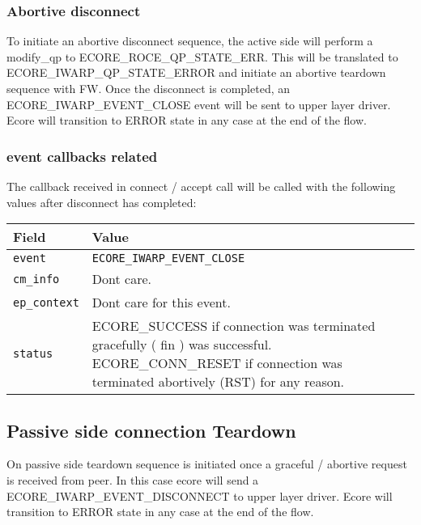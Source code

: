 \documentclass[11pt,fleqn,hidelinks,oneside]{book} %
\begin{document}
\subsubsection{Abortive disconnect}
To initiate an abortive disconnect sequence, the active side will perform a modify\_qp to ECORE\_ROCE\_QP\_STATE\_ERR. This will be translated to ECORE\_IWARP\_QP\_STATE\_ERROR and initiate an abortive teardown sequence with FW. Once the disconnect is completed, an ECORE\_IWARP\_EVENT\_CLOSE event will be sent to upper layer driver. Ecore will transition to ERROR state in any case at the end of the flow. 

\subsubsection{event callbacks related}
The callback received in connect / accept call will be called with the following values after disconnect has completed: \newline
\begin{tabular}{| l | p{10cm} |}
	\hline
	\textbf{Field} & \textbf{Value} \\ \hline
	\texttt{event} & \texttt{ECORE\_IWARP\_EVENT\_CLOSE} \\ \hline
	\texttt{cm\_info} & Dont care. \\ \hline
	\texttt{ep\_context} & Dont care for this event. \\ \hline
	\texttt{status} & ECORE\_SUCCESS if connection was terminated gracefully ( fin ) was successful. ECORE\_CONN\_RESET if connection was terminated abortively (RST) for any reason. \\ \hline
\end{tabular}

\subsection{Passive side connection Teardown}
On passive side teardown sequence is initiated once a graceful / abortive request is received from peer. In this case ecore will send a ECORE\_IWARP\_EVENT\_DISCONNECT to upper layer driver. Ecore will transition to ERROR state in any case at the end of the flow.
\end{document}
